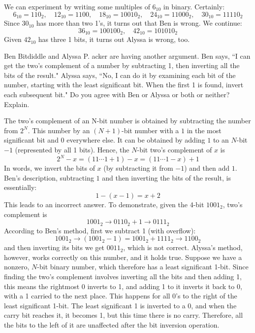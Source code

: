 \documentclass[12pt]{article}
\newenvironment{ex}[2][Exercise]{\begin{trivlist}
		\item[\hskip \labelsep {\bfseries #1}\hskip \labelsep {\bfseries #2.}]}{\end{trivlist}}
\newenvironment{sol}[1][Solution]{\begin{trivlist}
		\item[\hskip \labelsep {\bfseries #1:}]}{\end{trivlist}}
\begin{document}
\begin{sol}
	We can experiment by writing some multiples of $6_{10}$ in binary. Certainly:
	\[
	6_{10}=110_2,\quad 12_{10}=1100, \quad 18_{10}=10010_2,\quad 24_{10}=11000_2,\quad 30_{10}=11110_{2}
	\]
	Since $30_{10}$ has more than two 1's, it turns out that Ben is wrong. We continue:
	\[
	36_{10}=100100_2,\quad 42_{10}=101010_2
	\]
	Given $42_{10}$ has three 1 bits, it turns out Alyssa is wrong, too.
\end{sol}

\begin{ex}{1.68}
	Ben Bitdiddle and Alyssa P. acker are having another argument. Ben says, ``I can get the two's complement of a number by subtracting 1, then inverting all the bits of the result." Alyssa says, ``No, I can do it by examining each bit of the number, starting with the least significant bit. When the first 1 is found, invert each subsequent bit." Do you agree with Ben or Alyssa or both or neither? Explain.
\end{ex}

\begin{sol}
	The two's complement of an N-bit number is obtained by subtracting the number from $2^N$. This number by an $(N+1)$-bit number with a $1$ in the most significant bit and 0 everywhere else. It can be obtained by adding $1$ to an $N$-bit $-1$ (represented by all 1 bits). Hence, the $N$-bit two's complement of $x$ is
	\[
	2^{N}-x=(11\cdots1 + 1) - x=(11\cdots 1 - x)  + 1
	\]
	In words, we invert the bits of $x$ (by subtracting it from $-1$) and then add $1$. Ben's description, subtracting $1$ and then inverting the bits of the result, is essentially:
	\[
	1-(x-1)=x + 2
	\]
	This leads to an incorrect answer. To demonstrate, given the 4-bit $1001_2$, two's complement is
	\[
	1001_2\to 0110_2 + 1\to 0111_2
	\]
	According to Ben's method, first we subtract 1 (with overflow):
	\[
	1001_2\to (1001_2-1)=1001_2+1111_2\to 1100_2
	\]
	and then inverting its bits we get $0011_2$, which is not correct. Alyssa's method, however, works correctly on this number, and it holds true. Suppose we have a nonzero, $N$-bit binary number, which therefore has a least significant 1-bit. Since finding the two's complement involves inverting all the bits and then adding 1, this means the rightmost 0 inverts to 1, and adding 1 to it inverts it back to 0, with a 1 carried to the next place. This happens for all 0's to the right of the least significant 1-bit. The least significant 1 is inverted to a 0, and when the carry bit reaches it, it becomes 1, but this time there is no carry. Therefore, all the bits to the left of it are unaffected after the bit inversion operation.
\end{sol}
\end{document}
